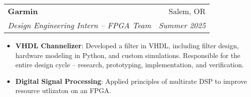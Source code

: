 \documentclass[letterpaper,10pt]{article}
\makeatletter
\newcommand{\resumeItem}[2]{
  \item\small{
    \textbf{#1}{: #2 \vspace{-2pt}}
  }
}
\newcommand{\resumeSubheading}[4]{
  \vspace{-1pt}\item
    \begin{tabular*}{0.97\textwidth}[t]{l@{\extracolsep{\fill}}r}
      \textbf{#1} & #2 \\
      \textit{\small#3} & \textit{\small #4} \\
    \end{tabular*}\vspace{-5pt}
}
\newcommand{\resumeSubSubheading}[2]{
    \begin{tabular*}{0.97\textwidth}{l@{\extracolsep{\fill}}r}
      \textit{\small#1} & \textit{\small #2} \\
    \end{tabular*}\vspace{-5pt}
}
\newcommand{\resumeItemListStart}{\begin{itemize}}
\newcommand{\resumeItemListEnd}{\end{itemize}\vspace{-5pt}}
\makeatother
\begin{document}

    \resumeSubheading
      {Garmin}{Salem, OR}
      {Design Engineering Intern -- FPGA Team}{Summer 2025}
      \resumeItemListStart
        \resumeItem{VHDL Channelizer}
          {Developed a filter in VHDL, including filter design, hardware modeling in Python, and custom simulations. Responsible for the entire design cycle -- research, prototyping, implementation, and verification.}
        \resumeItem{Digital Signal Processing}
          {Applied principles of multirate DSP to improve resource utlizaton on an FPGA.}
      \resumeItemListEnd
\end{document}
